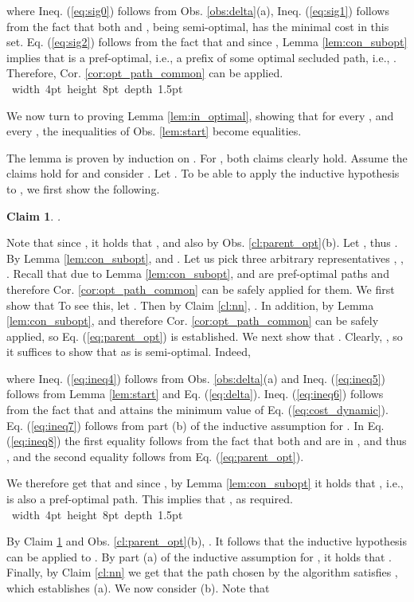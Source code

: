 \documentclass[12pt]{article}
\newtheorem{claim}{Claim}[section]
\def\inline#1:{\par\vskip 7pt\noindent{\bf #1:}\hskip 10pt}
\def\Proof{\par\noindent{\bf Proof:~}}
\def\blackslug{\hbox{\hskip 1pt \vrule width 4pt height 8pt
    depth 1.5pt \hskip 1pt}}
\def\QED{\quad\blackslug\lower 8.5pt\null\par}
\begin{document}
where Ineq. (\ref{eq:sig0}) follows from Obs. \ref{obs:delta}(a), Ineq. (\ref{eq:sig1}) follows from the fact that both  and , being semi-optimal, has the minimal cost in this set. Eq. (\ref{eq:sig2}) follows from the fact that  and since , Lemma \ref{lem:con_subopt} implies that  is a pref-optimal, i.e., a prefix of some optimal secluded path, i.e., . Therefore, Cor. \ref{cor:opt_path_common} can be applied.
\QED
We now turn to proving Lemma \ref{lem:in_optimal}, showing that for every , and every , the inequalities of Obs. \ref{lem:start} become equalities.
\inline Proof of Lemma \ref{lem:in_optimal}:
The lemma is proven by induction on . For , both claims clearly hold. Assume the claims hold for  and consider . Let . To be able to apply the inductive hypothesis to , we first show the following.
\begin{claim}
\label{cl:parent}
.
\end{claim}
\Proof
Note that since , it holds that , and also  by Obs. \ref{cl:parent_opt}(b).
Let , thus .
By Lemma \ref{lem:con_subopt},   and .
Let us pick three arbitrary representatives , , . Recall that due to Lemma \ref{lem:con_subopt},  and  are pref-optimal paths and therefore Cor. \ref{cor:opt_path_common} can be safely applied for them. We first show that 
To see this, let . Then by Claim \ref{cl:nn}, . In addition, by Lemma \ref{lem:con_subopt},  and therefore Cor. \ref{cor:opt_path_common} can be safely applied, so Eq. (\ref{eq:parent_opt}) is established. We next show that .  Clearly, , so it suffices to show that  as  is semi-optimal. Indeed,

where Ineq. (\ref{eq:ineq4}) follows from Obs. \ref{obs:delta}(a) and Ineq. (\ref{eq:ineq5}) follows from Lemma \ref{lem:start} and Eq. (\ref{eq:delta}). Ineq. (\ref{eq:ineq6}) follows from the fact that  and  attains the minimum value of Eq. (\ref{eq:cost_dynamic}). Eq. (\ref{eq:ineq7}) follows from part (b) of the inductive assumption for . In Eq. (\ref{eq:ineq8}) the first equality follows from the fact that both  and  are in , and thus , and the second equality follows from Eq.  (\ref{eq:parent_opt}).
\par We therefore get that  and since , by Lemma \ref{lem:con_subopt} it holds that , i.e.,  is also a pref-optimal path. This implies that , as required.
\QED
By Claim \ref{cl:parent} and Obs. \ref{cl:parent_opt}(b), . It follows that the inductive hypothesis can be applied to . By part (a) of the inductive assumption for , it holds that . Finally, by Claim \ref{cl:nn} we get that the path  chosen by the algorithm satisfies , which establishes (a).
We now consider (b). Note that
\end{document}
